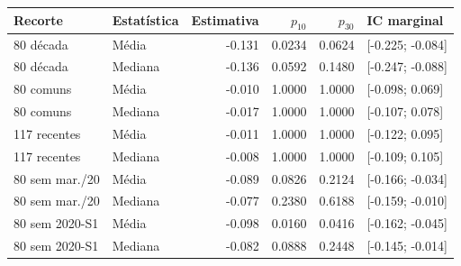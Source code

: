 \begin{tabular}{llrrrl}
\toprule
Recorte & Estatística & Estimativa & $p_{10}$ & $p_{30}$ & IC marginal\\
\midrule
80 década & Média & -0.131 & 0.0234 & 0.0624 & [-0.225; -0.084]\\
80 década & Mediana & -0.136 & 0.0592 & 0.1480 & [-0.247; -0.088]\\
80 comuns & Média & -0.010 & 1.0000 & 1.0000 & [-0.098; 0.069]\\
80 comuns & Mediana & -0.017 & 1.0000 & 1.0000 & [-0.107; 0.078]\\
117 recentes & Média & -0.011 & 1.0000 & 1.0000 & [-0.122; 0.095]\\
117 recentes & Mediana & -0.008 & 1.0000 & 1.0000 & [-0.109; 0.105]\\
80 sem mar./20 & Média & -0.089 & 0.0826 & 0.2124 & [-0.166; -0.034]\\
80 sem mar./20 & Mediana & -0.077 & 0.2380 & 0.6188 & [-0.159; -0.010]\\
80 sem 2020-S1 & Média & -0.098 & 0.0160 & 0.0416 & [-0.162; -0.045]\\
80 sem 2020-S1 & Mediana & -0.082 & 0.0888 & 0.2448 & [-0.145; -0.014]\\
\bottomrule
\end{tabular}
